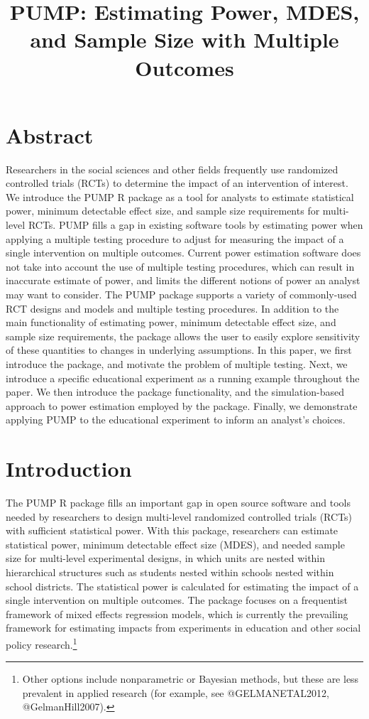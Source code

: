 \documentclass[
]{article}
\title{PUMP: Estimating Power, MDES, and Sample Size with Multiple
Outcomes}
\author{}
\date{\vspace{-2.5em}}
\begin{document}
\maketitle

\section*{Abstract}

Researchers in the social sciences and other fields frequently use
randomized controlled trials (RCTs) to determine the impact of an
intervention of interest. We introduce the PUMP R package as a tool for
analysts to estimate statistical power, minimum detectable effect size,
and sample size requirements for multi-level RCTs. PUMP fills a gap in
existing software tools by estimating power when applying a multiple
testing procedure to adjust for measuring the impact of a single
intervention on multiple outcomes. Current power estimation software
does not take into account the use of multiple testing procedures, which
can result in inaccurate estimate of power, and limits the different
notions of power an analyst may want to consider. The PUMP package
supports a variety of commonly-used RCT designs and models and multiple
testing procedures. In addition to the main functionality of estimating
power, minimum detectable effect size, and sample size requirements, the
package allows the user to easily explore sensitivity of these
quantities to changes in underlying assumptions. In this paper, we first
introduce the package, and motivate the problem of multiple testing.
Next, we introduce a specific educational experiment as a running
example throughout the paper. We then introduce the package
functionality, and the simulation-based approach to power estimation
employed by the package. Finally, we demonstrate applying PUMP to the
educational experiment to inform an analyst's choices.

\section{Introduction}
\label{sec:intro}

The PUMP R package fills an important gap in open source software and
tools needed by researchers to design multi-level randomized controlled
trials (RCTs) with sufficient statistical power. With this package,
researchers can estimate statistical power, minimum detectable effect
size (MDES), and needed sample size for multi-level experimental
designs, in which units are nested within hierarchical structures such
as students nested within schools nested within school districts. The
statistical power is calculated for estimating the impact of a single
intervention on multiple outcomes. The package focuses on a frequentist
framework of mixed effects regression models, which is currently the
prevailing framework for estimating impacts from experiments in
education and other social policy
research.\footnote{Other options include nonparametric or Bayesian methods, but these are less prevalent in applied research (for example, see @GELMANETAL2012, @GelmanHill2007).}
\end{document}
